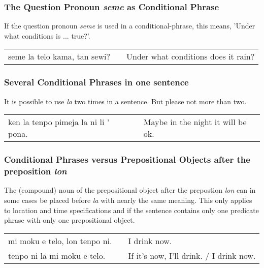 %
%
\subsubsection*{The Question Pronoun \textit{seme} as Conditional Phrase}
%
%

If the question pronoun \textit{seme} is used in a conditional-phrase, this means, 'Under what conditions is ... true?'.

\begin{supertabular}{p{5,5cm}|ll}
    seme la telo kama, tan sewi? &  & Under what conditions does it rain? \\
\end{supertabular}

%
%
\subsubsection*{Several Conditional Phrases in one sentence}
%
%
It is possible to use \textit{la} two times in a sentence.
But please not more than two.

\begin{supertabular}{p{5,5cm}|ll}
    ken la tenpo pimeja la ni li ' pona. &  & Maybe in the night it will be ok. \\
\end{supertabular}

%
%
\subsubsection*{Conditional Phrases versus Prepositional Objects after the preposition \textit{lon} }
%
The (compound) noun of the prepositional object after the prepostion \textit{lon} can in some cases be placed before \textit{la} with nearly the same meaning.
This only applies to location and time specifications and if the sentence contains only one predicate phrase with only one prepositional object.

\begin{supertabular}{p{5,5cm}|ll}
    mi moku e telo, lon tenpo ni. &  & I drink now.                            \\
    tenpo ni la mi moku e telo.   &  & If it's now, I'll drink. / I drink now. \\
\end{supertabular}

